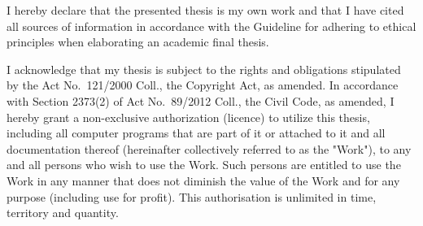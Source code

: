 \documentclass[english,bachelor,oneside]{ctufit-thesis} %
\begin{document}
\begin{declarationpage}
I hereby declare that the presented thesis is my own work and that I have cited all sources of information in accordance with the Guideline for adhering to ethical principles when elaborating an academic final thesis.

I acknowledge that my thesis is subject to the rights and obligations stipulated by the Act No.~121/2000 Coll., the Copyright Act, as amended. In accordance with Section 2373(2) of Act No.~89/2012 Coll., the Civil Code, as amended, I hereby grant a non-exclusive authorization (licence) to utilize this thesis, including all computer programs that are part of it or attached to it and all documentation thereof (hereinafter collectively referred to as the "Work"), to any and all persons who wish to use the Work. Such persons are entitled to use the Work in any manner that does not diminish the value of the Work and for any purpose (including use for profit). This authorisation is unlimited in time, territory and quantity.
\end{declarationpage}

\printabstractpage %

%
%

\tableofcontents %
\end{document}
